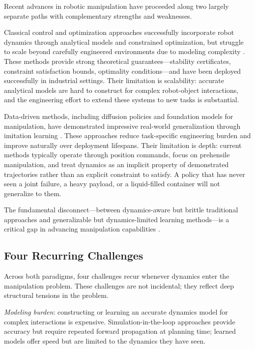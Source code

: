 Recent advances in robotic manipulation have proceeded along two largely separate paths with complementary strengths and weaknesses.

Classical control and optimization approaches successfully incorporate robot dynamics through analytical models and constrained optimization, but struggle to scale beyond carefully engineered environments due to modeling complexity \cite{feng2014optimization,gamba2023springy}.
These methods provide strong theoretical guarantees---stability certificates, constraint satisfaction bounds, optimality conditions---and have been deployed successfully in industrial settings.
Their limitation is scalability: accurate analytical models are hard to construct for complex robot-object interactions, and the engineering effort to extend these systems to new tasks is substantial.

Data-driven methods, including diffusion policies and foundation models for manipulation, have demonstrated impressive real-world generalization through imitation learning \cite{chi2023diffusion,team2024octo}.
These approaches reduce task-specific engineering burden and improve naturally over deployment lifespans.
Their limitation is depth: current methods typically operate through position commands, focus on prehensile manipulation, and treat dynamics as an implicit property of demonstrated trajectories rather than an explicit constraint to satisfy.
A policy that has never seen a joint failure, a heavy payload, or a liquid-filled container will not generalize to them.

The fundamental disconnect---between dynamics-aware but brittle traditional approaches and generalizable but dynamics-limited learning methods---is a critical gap in advancing manipulation capabilities \cite{ruggiero2018nonprehensile}.

\subsection{Four Recurring Challenges}
\label{sec:intro:challenges}

Across both paradigms, four challenges recur whenever dynamics enter the manipulation problem.
These challenges are not incidental; they reflect deep structural tensions in the problem.

\textit{Modeling burden}: constructing or learning an accurate dynamics model for complex interactions is expensive.
Simulation-in-the-loop approaches provide accuracy but require repeated forward propagation at planning time; learned models offer speed but are limited to the dynamics they have seen.

